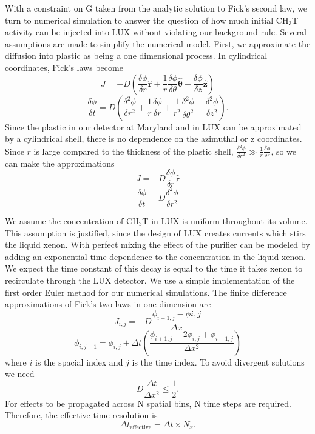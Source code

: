 With a constraint on G taken from the analytic solution to Fick's second law, we turn to numerical simulation to answer
the question of how much initial CH$_3$T activity can be injected into LUX without violating our background rule. Several assumptions are made to simplify the numerical model. First, we approximate the diffusion into plastic as being a one dimensional process. In cylindrical coordinates, Fick's laws become
\begin{equation}
J = -D \left( \frac{\delta \phi}{\delta r} \mathbf{\hat{r}} + \frac{1}{r} \frac{\delta \phi}{\delta \theta} \boldsymbol{\hat{\theta}} + \frac{\delta \phi}{\delta z} \mathbf{\hat{z}} \right) 
\end{equation}
\begin{equation}
\frac{\delta \phi}{\delta t} = D \left( \frac{\delta^2 \phi}{\delta r^2} + \frac{1}{r}\frac{\delta \phi}{\delta r} + \frac{1}{r^2} \frac{\delta^2 \phi}{\delta \theta^2} + \frac{\delta^2 \phi}{\delta z^2} \right).
\end{equation}
Since the plastic in our detector at Maryland and in LUX can be approximated by a cylindrical shell, there is no dependence on the azimuthal or z coordinates. Since $r$ is large compared to the thickness of the plastic shell, $\frac{\delta^2 \phi}{\delta r^2} \gg \frac{1}{r}\frac{\delta \phi}{\delta r}$, so we can make the approximations
\begin{equation}
J=-D\frac{\delta \phi}{\delta r} \mathbf{\hat{r}}
\end{equation}
\begin{equation}
\frac{\delta \phi}{\delta t} = D \frac{\delta^2 \phi}{\delta r^2}
\end{equation}

We assume the concentration of CH$_3$T in LUX is uniform throughout its volume. This assumption is justified, since the design of LUX creates currents which stirs the liquid xenon. With perfect mixing the effect of the purifier can be modeled by adding an exponential time dependence to the concentration in the liquid xenon.  We expect the time constant of this decay is equal to the time it takes xenon to recirculate through the LUX detector. We use a simple implementation of the first order Euler method for our numerical simulations. The finite difference approximations of Fick's two laws in one dimension are
\begin{equation}
J_{i,j}=-D \frac{ \phi_{i+1,j} - \phi{i,j}}{\Delta x}
\end{equation}
\begin{equation}
\phi_{i,j+1}=\phi_{i,j}+ \Delta t \left( \frac{\phi_{i+1,j}-2\phi_{i,j}+\phi_{i-1,j}}{\Delta x^2}\right)
\end{equation}
where $i$ is the spacial index and $j$ is the time index.  To avoid divergent solutions we need
\begin{equation}
D\frac{\Delta t}{\Delta x^2} \le \frac{1}{2}.
\end{equation}
For effects to be propagated across N spatial bins, N time steps are required.
Therefore, the effective time resolution is
\begin{equation}
\Delta t_{\text{effective}}=\Delta t \times N_x.
\end{equation}

